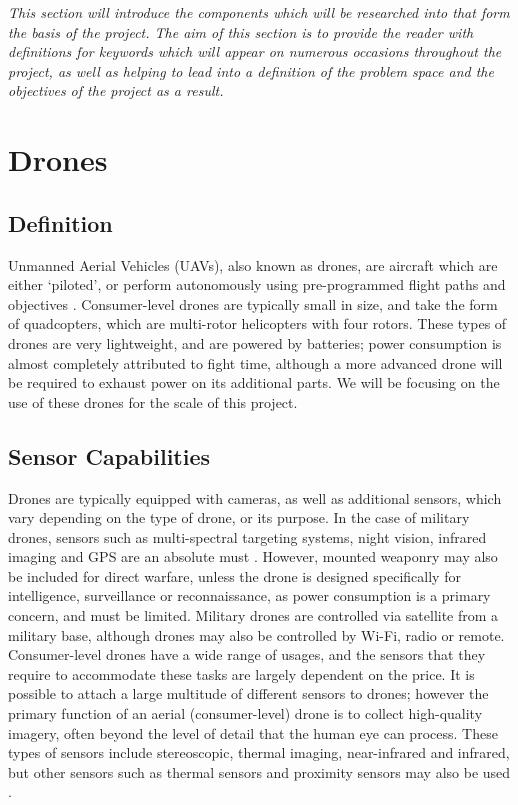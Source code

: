 \emph{This section will introduce the components which will be researched into that form the basis of the project. The aim of this section is to provide the reader with definitions for keywords which will appear on numerous occasions throughout the project, as well as helping to lead into a definition of the problem space and the objectives of the project as a result.}
	\section{Drones}
		\subsection{Definition}
		Unmanned Aerial Vehicles (UAVs), also known as drones, are aircraft which are either `piloted', or perform autonomously using pre-programmed flight paths and objectives \cite{chriscolejimwright2010}. Consumer-level drones are typically small in size, and take the form of quadcopters, which are multi-rotor helicopters with four rotors.  These types of drones are very lightweight, and are powered by batteries; power consumption is almost completely attributed to fight time, although a more advanced drone will be required to exhaust power on its additional parts. We will be focusing on the use of these drones for the scale of this project.
		\subsection{Sensor Capabilities}
		Drones are typically equipped with cameras, as well as additional sensors, which vary depending on the type of drone, or its purpose. In the case of military drones, sensors such as multi-spectral targeting systems, night vision, infrared imaging and GPS are an absolute must \cite{usairforce2015}. However, mounted weaponry may also be included for direct warfare, unless the drone is designed specifically for intelligence, surveillance or reconnaissance, as power consumption is a primary concern, and must be limited. Military drones are controlled via satellite from a military base, although drones may also be controlled by Wi-Fi, radio or remote. Consumer-level drones have a wide range of usages, and the sensors that they require to accommodate these tasks are largely dependent on the price. It is possible to attach a large multitude of different sensors to drones; however the primary function of an aerial (consumer-level) drone is to collect high-quality imagery, often beyond the level of detail that the human eye can process.  These types of sensors include stereoscopic, thermal imaging, near-infrared and infrared, but other sensors such as thermal sensors and proximity sensors may also be used \cite{ questuav2015}.
